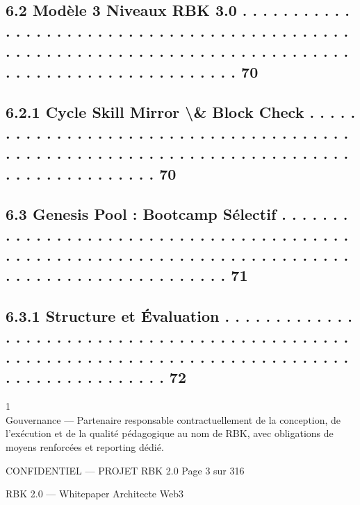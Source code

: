 \subsection{6.2     Modèle 3 Niveaux RBK 3.0 . . . . . . . . . . . . . . . . . . . . . . . . . . . . . . . . . . . . . . . . . . . . . . . . . . . . . . . . . . . . . . . . . . . . . . . . . . . . . . . . . . . . . . . . . . . . . . . . . . . . . . 70}
\subsection{6.2.1              Cycle Skill Mirror \textbackslash{}& Block Check . . . . . . . . . . . . . . . . . . . . . . . . . . . . . . . . . . . . . . . . . . . . . . . . . . . . . . . . . . . . . . . . . . . . . . . . . . . . . . . . . . . . . . . . 70}
\subsection{6.3     Genesis Pool : Bootcamp Sélectif . . . . . . . . . . . . . . . . . . . . . . . . . . . . . . . . . . . . . . . . . . . . . . . . . . . . . . . . . . . . . . . . . . . . . . . . . . . . . . . . . . . . . . . . . . . . . . . . . 71}
\subsection{6.3.1              Structure et Évaluation . . . . . . . . . . . . . . . . . . . . . . . . . . . . . . . . . . . . . . . . . . . . . . . . . . . . . . . . . . . . . . . . . . . . . . . . . . . . . . . . . . . . . . . . . . . . . . . . . 72}
1\\
Gouvernance — Partenaire responsable contractuellement de la conception, de l’exécution et de la qualité pédagogique au nom de RBK, avec obligations de\\
moyens renforcées et reporting dédié.\\
\vspace{0.5em}
\vspace{0.5em}
\vspace{0.5em}
\vspace{0.5em}
\begin{confidential}CONFIDENTIEL — PROJET RBK 2.0                                                                               Page 3 sur 316\end{confidential}
RBK 2.0 — Whitepaper Architecte Web3\\
\vspace{0.5em}
\vspace{0.5em}
